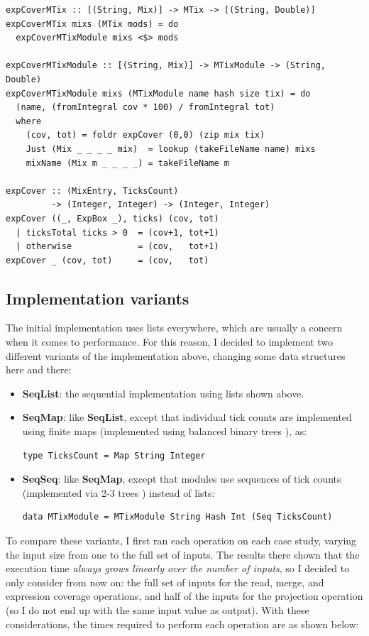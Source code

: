 \documentclass[a4paper,10pt]{article}
\begin{document}
\begin{verbatim}
expCoverMTix :: [(String, Mix)] -> MTix -> [(String, Double)]
expCoverMTix mixs (MTix mods) = do
  expCoverMTixModule mixs <$> mods

expCoverMTixModule :: [(String, Mix)] -> MTixModule -> (String, Double)
expCoverMTixModule mixs (MTixModule name hash size tix) = do
  (name, (fromIntegral cov * 100) / fromIntegral tot)
  where
    (cov, tot) = foldr expCover (0,0) (zip mix tix)
    Just (Mix _ _ _ _ mix)  = lookup (takeFileName name) mixs
    mixName (Mix m _ _ _ _) = takeFileName m

expCover :: (MixEntry, TicksCount)
         -> (Integer, Integer) -> (Integer, Integer)
expCover ((_, ExpBox _), ticks) (cov, tot)
  | ticksTotal ticks > 0  = (cov+1, tot+1)
  | otherwise             = (cov,   tot+1)
expCover _ (cov, tot)     = (cov,   tot)
\end{verbatim}

\subsection*{Implementation variants}

The initial implementation uses lists everywhere, which are usually a concern
when it comes to performance.
%
For this reason, I decided to implement two different variants of the
implementation above, changing some data structures here and there:

\begin{itemize}
\item \textbf{SeqList}: the sequential implementation using lists shown above.
\item \textbf{SeqMap}: like \textbf{SeqList}, except that individual tick counts
  are implemented using finite maps (implemented using balanced binary trees
  \cite{data-map}), as:
\begin{verbatim}
type TicksCount = Map String Integer
\end{verbatim}
\item \textbf{SeqSeq}: like \textbf{SeqMap}, except that modules use sequences
  of tick counts (implemented via 2-3 trees \cite{data-sequence}) instead of lists:
\begin{verbatim}
data MTixModule = MTixModule String Hash Int (Seq TicksCount)
\end{verbatim}
\end{itemize}

To compare these variants, I first ran each operation on each case study,
varying the input size from one to the full set of inputs.
%
The results there shown that the execution time \emph{always grows linearly over
  the number of inputs}, so I decided to only consider from now on: the full set
of inputs for the read, merge, and expression coverage operations, and half of
the inputs for the projection operation (so I do not end up with the same input
value as output).
%
With these considerations, the times required to perform each operation are as
shown below:\\
\end{document}
